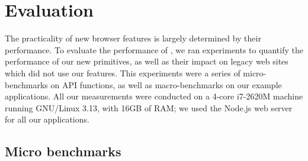 \section{Evaluation}
\label{sec:eval}

The practicality of new browser features is largely determined
by their performance.
%
To evaluate the performance of \sys{}, we ran experiments to
quantify the performance of our new primitives, as well as their
impact on legacy web sites which did not use our features.
%
This experiments were a series of micro-benchmarks on API functions,
as well as macro-benchmarks on our example applications.
%
All our measurements were conducted on a 4-core i7-2620M machine
running GNU/Linux 3.13, with 16GB of RAM\@; we used the Node.js web
server for all our applications.

\subsection{Micro benchmarks}
\label{sec:eval:micro}

\newcommand*\rot{\rotatebox{90}}

